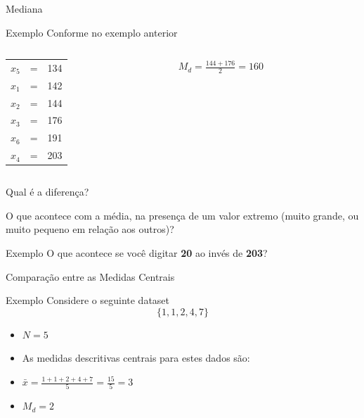 \documentclass{beamer}
\begin{document}
\begin{frame}{\scriptsize Mediana}
  \begin{exampleblock}{Exemplo}
    \footnotesize
Conforme no exemplo anterior
    \begin{columns}
      \begin{column}{5cm}
        \begin{tabular}{ccc}
          $x_5$ &=&134\\
          $x_1$ &=&142\\
          $x_2$ &=&\alert{144}\\
          $x_3$ &=&\alert{176}\\
          $x_6$ &=&191\\
          $x_4$ &=&203\\
        \end{tabular}
      \end{column}
      \begin{column}{5cm}
        $M_d = \frac{144+176}{2}=160$
      \end{column}
    \end{columns}
  \end{exampleblock}
\end{frame}

\begin{frame}{\scriptsize Qual é a diferença?}
  \begin{block}{}
    \footnotesize
    O que acontece com a média, na presença de um valor extremo (muito grande, ou muito pequeno em relação aos outros)?
  \end{block}
  \begin{exampleblock}{Exemplo}
    \footnotesize
    O que acontece se você digitar {\bf 20} ao invés de {\bf 203}?
  \end{exampleblock}
\end{frame}

\begin{frame}{\scriptsize Comparação entre as Medidas Centrais}
  \begin{exampleblock}{Exemplo}
    \footnotesize
    Considere o seguinte dataset $$\{ 1,1,2,4,7\}$$
  \begin{itemize}
    \footnotesize
  \item $N=5$
  \item As medidas descritivas centrais para estes dados são:
  \item $\bar{x} = \frac{1+1+2+4+7}{5} = \frac{15}{5}= 3$
  \item $M_d = 2$
  \end{itemize}
\end{exampleblock}
\end{frame}
\end{document}
